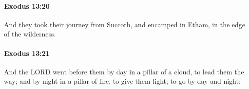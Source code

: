 		\paragraph{Exodus 13:20} %
			\label{EXODUS-13-20}

			And they took their journey from Succoth, and encamped in Etham, in the edge of the wilderness.


		\paragraph{Exodus 13:21} %
			\label{EXODUS-13-21}

			And the LORD went before them by day in a pillar of a cloud, to lead them the way; and by night in a pillar of fire, to give them light; to go by day and night:



